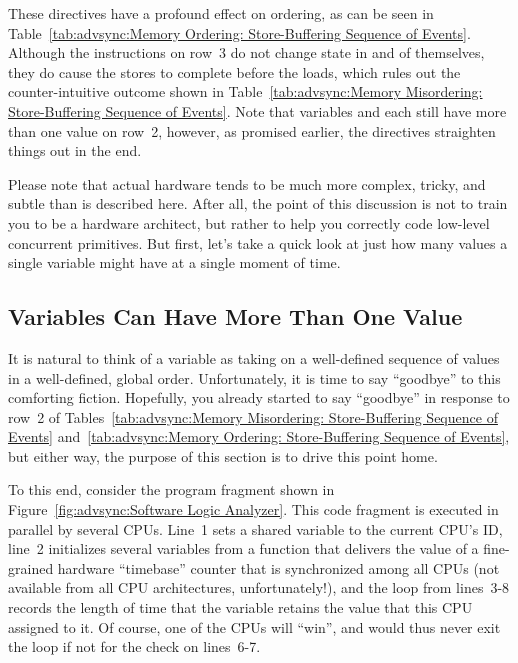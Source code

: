 These directives have a profound effect on ordering, as can be seen in
Table~\ref{tab:advsync:Memory Ordering: Store-Buffering Sequence of Events}.
Although the  instructions on row~3
do not change state
in and of themselves, they do cause the stores to complete before the
loads, which rules out the counter-intuitive outcome shown in
Table~\ref{tab:advsync:Memory Misordering: Store-Buffering Sequence of Events}.
Note that variables  and  each still have more than one
value on row~2, however, as promised earlier, the directives straighten
things out in the end.

Please note that actual hardware tends to be much more complex, tricky,
and subtle than is described here.
After all, the point of this discussion is not to train you to be
a hardware architect, but rather to help you correctly code
low-level concurrent primitives.
But first, let's take a quick look at just how many values a single
variable might have at a single moment of time.

\subsection{Variables Can Have More Than One Value}
\label{sec:advsync:Variables Can Have More Than One Value}

It is natural to think of a variable as taking on a well-defined
sequence of values in a well-defined, global order.
Unfortunately, it is time to say ``goodbye'' to this comforting fiction.
Hopefully, you already started to say ``goodbye'' in response to row~2 of
Tables~\ref{tab:advsync:Memory Misordering: Store-Buffering Sequence of Events}
and~\ref{tab:advsync:Memory Ordering: Store-Buffering Sequence of Events},
but either way, the purpose of this section is to drive this point home.

To this end, consider the program fragment shown in
Figure~\ref{fig:advsync:Software Logic Analyzer}.
This code fragment is executed in parallel by several CPUs.
Line~1 sets a shared variable to the current CPU's ID, line~2
initializes several variables from a  function that
delivers the value of a fine-grained hardware ``timebase'' counter that is
synchronized among all CPUs (not available from all CPU architectures,
unfortunately!), and the loop from lines~3-8 records the length of
time that the variable retains the value that this CPU assigned to it.
Of course, one of the CPUs will ``win'', and would thus never exit
the loop if not for the check on lines~6-7.

